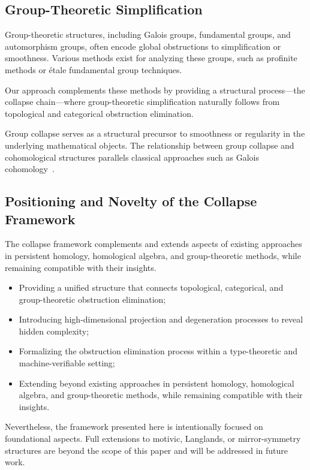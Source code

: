 \documentclass[11pt]{article}
\begin{document}
\subsection{Group-Theoretic Simplification}

Group-theoretic structures, including Galois groups, fundamental groups, and automorphism groups, often encode global obstructions to simplification or smoothness. Various methods exist for analyzing these groups, such as profinite methods or étale fundamental group techniques.

Our approach complements these methods by providing a structural process—the collapse chain—where group-theoretic simplification naturally follows from topological and categorical obstruction elimination.

Group collapse serves as a structural precursor to smoothness or regularity in the underlying mathematical objects.
The relationship between group collapse and cohomological structures parallels classical approaches such as Galois cohomology~\cite{Serre1997}.


\subsection{Positioning and Novelty of the Collapse Framework}

The collapse framework complements and extends aspects of existing approaches in persistent homology, homological algebra, and group-theoretic methods, while remaining compatible with their insights.

\begin{itemize}
    \item Providing a unified structure that connects topological, categorical, and group-theoretic obstruction elimination;
    \item Introducing high-dimensional projection and degeneration processes to reveal hidden complexity;
    \item Formalizing the obstruction elimination process within a type-theoretic and machine-verifiable setting;
    \item Extending beyond existing approaches in persistent homology, homological algebra, and group-theoretic methods, while remaining compatible with their insights.
\end{itemize}

Nevertheless, the framework presented here is intentionally focused on foundational aspects. Full extensions to motivic, Langlands, or mirror-symmetry structures are beyond the scope of this paper and will be addressed in future work.
\end{document}
